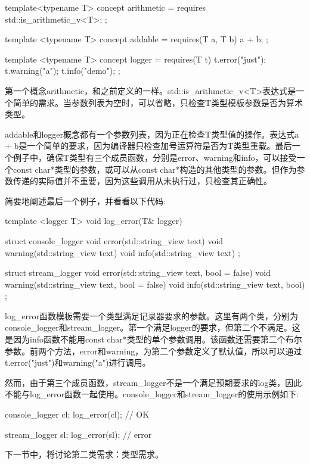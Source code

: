 \begin{cpp}
template<typename T>
concept arithmetic = requires
{
	std::is_arithmetic_v<T>;
};

template <typename T>
concept addable = requires(T a, T b)
{
	a + b;
};

template <typename T>
concept logger = requires(T t)
{
	t.error("just");
	t.warning("a");
	t.info("demo");
};
\end{cpp}

第一个概念arithmetic，和之前定义的一样。std::is\_arithmetic\_v<T>表达式是一个简单的需求。当参数列表为空时，可以省略，只检查T类型模板参数是否为算术类型。

addable和logger概念都有一个参数列表，因为正在检查T类型值的操作。表达式a + b是一个简单的要求，因为编译器只检查加号运算符是否为T类型重载。最后一个例子中，确保T类型有三个成员函数，分别是error、warning和info，可以接受一个const char*类型的参数，或可以从const char*构造的其他类型的参数。但作为参数传递的实际值并不重要，因为这些调用从未执行过，只检查其正确性。

简要地阐述最后一个例子，并看看以下代码:

\begin{cpp}
template <logger T>
void log_error(T& logger)
{}

struct console_logger
{
	void error(std::string_view text){}
	void warning(std::string_view text) {}
	void info(std::string_view text) {}
};

struct stream_logger
{
	void error(std::string_view text, bool = false) {}
	void warning(std::string_view text, bool = false) {}
	void info(std::string_view text, bool) {}
};
\end{cpp}

log\_error函数模板需要一个类型满足记录器要求的参数。这里有两个类，分别为console\_logger和stream\_logger。第一个满足logger的要求，但第二个不满足。这是因为info函数不能用const char*类型的单个参数调用。该函数还需要第二个布尔参数。前两个方法，error和warning，为第二个参数定义了默认值，所以可以通过t.error("just")和warning("a")进行调用。

然而，由于第三个成员函数，stream\_logger不是一个满足预期要求的log类，因此不能与log\_error函数一起使用。console\_logger和stream\_logger的使用示例如下:

\begin{cpp}
console_logger cl;
log_error(cl); // OK

stream_logger sl;
log_error(sl); // error
\end{cpp}

下一节中，将讨论第二类需求：类型需求。

